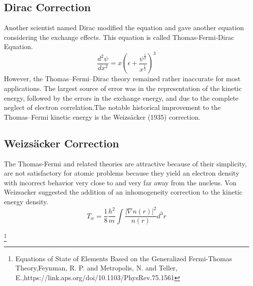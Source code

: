 \subsection{Dirac Correction}
Another scientist named Dirac modified the equation and gave another equation considering the exchange effects. This equation is called Thomas-Fermi-Dirac Equation.
\newline
\newline
\begin{equation}
\frac{d^2 \psi}{dx^2}=x(\epsilon+\frac{\psi^\frac{1}{2}}{x^\frac{1}{2}}  )^3
\end{equation}
\newline
However, the Thomas–Fermi–Dirac theory remained rather inaccurate for most applications. The largest source of error was in the representation of the kinetic energy, followed by the errors in the exchange energy, and due to the complete neglect of electron correlation.The notable historical improvement to the Thomas–Fermi kinetic energy is the Weizsäcker (1935) correction.
\subsection{Weizsäcker Correction}
The Thomas-Fermi and related theories are attractive because of their simplicity, are not satisfactory for atomic problems because they yield an electron density with incorrect behavior very close to and very far away from the nucleus. Von Weizsacker suggested the addition of an inhomogeneity correction to the kinetic energy density.
\begin{equation}
T_w=\frac{1}{8}\frac{h^2}{m}\int \frac{|\nabla n(r)|^2}{n(r)}d^3r
\end{equation}

\footnote{Equations of State of Elements Based on the Generalized Fermi-Thomas Theory,Feynman, R. P. and Metropolis, N. and Teller, E.,https://link.aps.org/doi/10.1103/PhysRev.75.1561}


%
